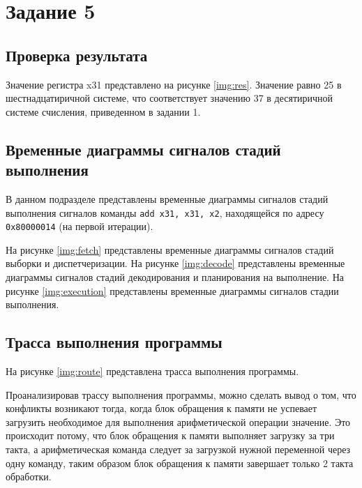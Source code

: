 \chapter{Задание 5}

\section{Проверка результата}

Значение регистра x31 представлено на рисунке \ref{img:res}. Значение равно 25
в шестнадцатиричной системе, что соответствует значению 37 в десятиричной
системе счисления, приведенном в задании 1.


\section{Временные диаграммы сигналов стадий выполнения}

В данном подразделе представлены временные диаграммы сигналов стадий выполнения
сигналов команды \texttt{add x31, x31, x2}, находящейся по адресу
\texttt{0x80000014} (на первой итерации).

На рисунке \ref{img:fetch} представлены временные диаграммы сигналов
стадий выборки и диспетчеризации.
На рисунке \ref{img:decode} представлены временные диаграммы сигналов
стадий декодирования и планирования на выполнение.
На рисунке \ref{img:execution} представлены временные диаграммы сигналов
стадии выполнения.




\section{Трасса выполнения программы}

На рисунке \ref{img:route} представлена трасса выполнения программы.


Проанализировав трассу выполнения программы, можно сделать вывод о том, что
конфликты возникают тогда, когда блок обращения к памяти не успевает загрузить
необходимое для выполнения арифметической операции значение. Это происходит
потому, что блок обращения к памяти выполняет загрузку за три такта, а
арифметическая команда следует за загрузкой нужной переменной через одну
команду, таким образом блок обращения к памяти завершает только 2 такта
обработки.

